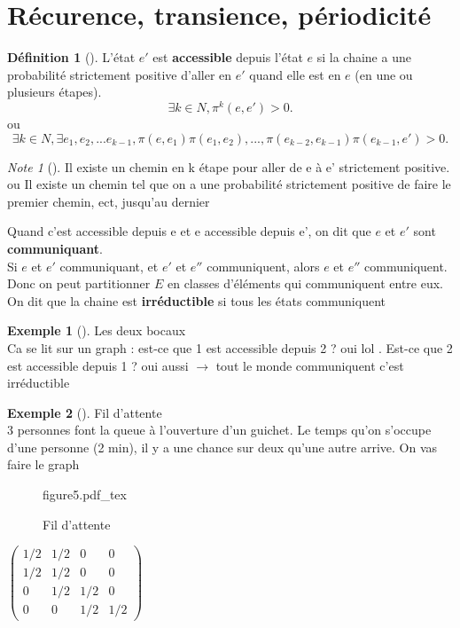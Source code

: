 \documentclass{article}
\newcommand{\incfig}[2][1]{%
	\def\svgwidth{#1\columnwidth}
	{#2.pdf_tex}
}
\theoremstyle{plain}%
\theoremstyle{definition}
\newtheorem{defn}{Définition}[section]
\newtheorem{exmp}{Exemple}[section]
\theoremstyle{remark}
\newtheorem*{note}{Note}
\begin{document}
\section{Récurence, transience, périodicité}

\begin{defn}[]
	L'état $ e' $ est \textbf{accessible} depuis l'état $ e $  si la chaine a une probabilité strictement positive d'aller en $ e' $ quand elle est en $ e $ (en une ou plusieurs étapes). 
	\[
		\exists k \in N , \pi ^k(e,e') > 0
	.\]
	ou 
	\[
		\exists k \in N, \exists e_1, e_2, ... e_{k-1}, \pi (e,e_1)\pi (e_1,e_2), ... , \pi (e_{k-2}, e_{k-1}) \pi (e_{k-1}, e') > 0
	.\]
	
	\begin{note}[]
		Il existe un chemin en k étape pour aller de e à e' strictement positive. \\ ou 
		Il existe un chemin tel que on a une probabilité strictement positive de faire le premier chemin, ect, jusqu'au dernier
	\end{note}
	
	Quand c'est accessible depuis e et e accessible depuis e', on dit que $e$ et $e'$ sont \textbf{communiquant}. \\
	Si $ e $ et $ e' $ communiquant, et $ e' $  et $ e'' $ communiquent, alors $ e $  et $ e'' $ communiquent. Donc on peut partitionner $ E $ en classes d'éléments qui communiquent entre eux. On dit que la chaine est \textbf{irréductible} si tous les états communiquent 
\end{defn}

\begin{exmp}[]
	Les deux bocaux \\
	Ca se lit sur un graph : est-ce que 1 est accessible depuis 2 ? oui lol . Est-ce que 2 est accessible depuis 1 ? oui aussi $\rightarrow$ tout le monde communiquent c'est irréductible
\end{exmp}

\begin{exmp}[]
	Fil d'attente \\
	3 personnes font la queue à l'ouverture d'un guichet. Le temps qu'on s'occupe d'une personne (2 min), il y a une chance sur deux qu'une autre arrive. On vas faire le graph
	\begin{figure}[!htbp]
		\centering
		\incfig[0.5]{figure5}
		\caption{Fil d'attente}
		\label{}
	\end{figure}
	$\begin{pmatrix}
		1/2 & 1/2 & 0 & 0 \\
		1/2 & 1/2 & 0 & 0 \\
		0 & 1/2 & 1/2 & 0 \\
		0 & 0 & 1/2 & 1/2
	\end{pmatrix}$	
\end{exmp}
\end{document}
